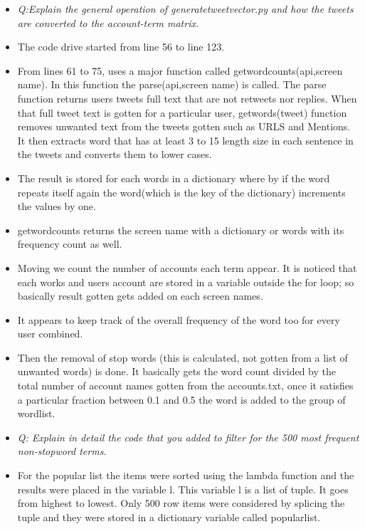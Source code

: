 \documentclass[12pt]{article}
\begin{document}
\begin{itemize}
\item \emph{Q:Explain the general operation of generatetweetvector.py and how the tweets are converted to the account-term matrix.}

\item The code drive started from line 56 to line 123.

\item From lines 61 to 75, uses a major function called getwordcounts(api,screen name). In this function the parse(api,screen name) is called. The parse function returns users tweets full text that are not retweets nor replies. When that full tweet text is gotten for a particular user, getwords(tweet) function removes unwanted text from the tweets gotten such as URLS and Mentions. It then extracts word that has at least 3 to 15 length size in each sentence in the tweets and converts them to lower cases.

\item The result is stored for each words in a dictionary where by if the word repeats itself again the word(which is the key of the dictionary) increments the values by one.

\item getwordcounts returns the screen name with a dictionary or words with its frequency count as well.

\item Moving we count the number of accounts each term appear. It is noticed that each works and users account are stored in a variable outside the for loop; so basically result gotten gets added on each screen names.

\item It appears to keep track of the overall frequency of the word too for every user combined.

\item Then the removal of stop words (this is calculated, not gotten from a list of unwanted words) is done. It basically gets the word count divided by the total number of account names gotten from the accounts.txt, once it satisfies a particular fraction between 0.1 and 0.5 the word is added to the group of wordlist.

\item \emph{Q: Explain in detail the code that you added to filter for the 500 most frequent non-stopword terms.}

\item For the popular list the items were sorted using the lambda function and the results were placed in the variable l. This variable l is a list of tuple. It goes from highest to lowest. Only 500 row items were considered by splicing the tuple and they were stored in a dictionary variable called popularlist.


\end{itemize}
\end{document}
